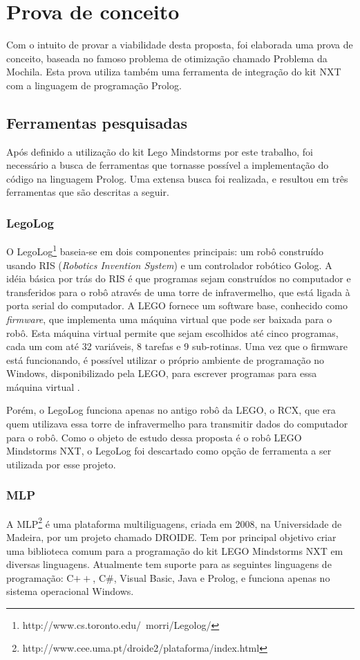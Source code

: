 \section{Prova de conceito} \label{provaDeConceito}
Com o intuito de provar a viabilidade desta proposta, foi elaborada uma prova de conceito, baseada no famoso problema de otimização chamado Problema da Mochila. Esta prova utiliza também uma ferramenta de integração do kit NXT com a linguagem de programação Prolog.

\subsection{Ferramentas pesquisadas}
Após definido a utilização do kit Lego Mindstorms por este trabalho, foi necessário a busca de ferramentas que tornasse possível a implementação do código na linguagem Prolog. Uma extensa busca foi realizada, e resultou em três ferramentas que são descritas a seguir.
\subsubsection{LegoLog}
O LegoLog\footnote{http://www.cs.toronto.edu/~morri/Legolog/} baseia-se em dois componentes principais: um robô construído usando RIS (\textit{Robotics Invention System}) e um controlador robótico Golog. A idéia básica por trás do RIS é que programas sejam construídos no computador e transferidos para o robô através de uma torre de infravermelho, que está ligada à porta serial do computador. A LEGO fornece um software base, conhecido como \textit{firmware}, que implementa uma máquina virtual que pode ser baixada para o robô.  Esta máquina virtual permite que sejam escolhidos até cinco programas, cada um com até 32 variáveis, 8 tarefas e 9 sub-rotinas. Uma vez que o firmware está funcionando, é possível utilizar o próprio ambiente de programação no Windows, disponibilizado pela LEGO, para escrever programas para essa máquina virtual \cite{levesque2000legolog}. 

Porém, o LegoLog funciona apenas no antigo robô da LEGO, o RCX, que era quem utilizava essa torre de infravermelho para transmitir dados do computador para o robô. Como o objeto de estudo dessa proposta é o robô LEGO Mindstorms NXT, o LegoLog foi descartado como opção de ferramenta a ser utilizada por esse projeto.

\subsubsection{MLP}
A MLP\footnote{http://www.cee.uma.pt/droide2/plataforma/index.html} é uma plataforma multiliguagens, criada em 2008, na Universidade de Madeira, por um projeto chamado DROIDE. Tem por principal objetivo criar uma biblioteca comum para a programação do kit LEGO Mindstorms NXT em diversas linguagens. Atualmente tem suporte para as seguintes linguagens de programação: C$++$, C\#, Visual Basic, Java e Prolog, e funciona apenas no sistema operacional Windows. 


